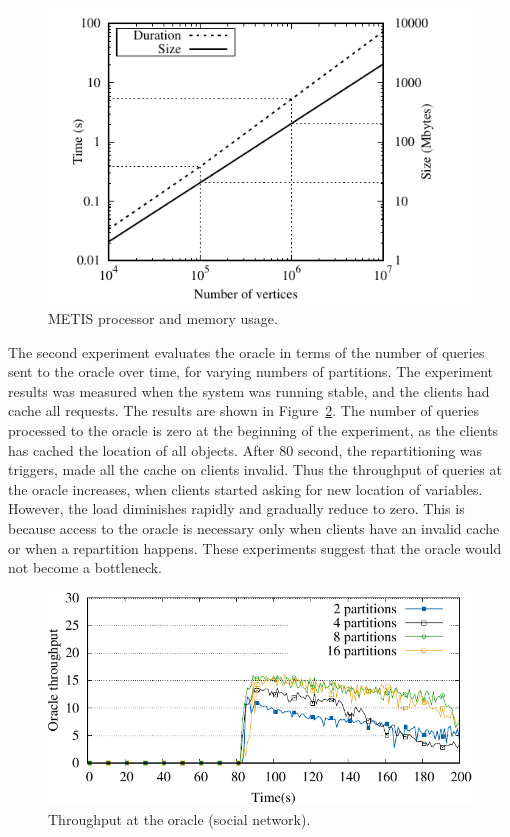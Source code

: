 \begin{figure}[ht!]
  \centering
    \includegraphics[width=\columnwidth]{figures/metis_size_time}
	\caption{METIS processor and memory usage.}
	\label{fig:metis_size_time}
\end{figure}

The second experiment evaluates the oracle in terms of the number of queries sent to the oracle over
time, for varying numbers of partitions. The experiment results was measured when the system was running stable, 
and the clients had cache all requests.  The results are shown in
Figure~\ref{fig:cpu_oracle}. The number of queries processed to the oracle is zero at the 
beginning of the experiment, as the clients has cached the location of all objects.
After 80 second, the repartitioning was triggers, made all the cache on clients invalid.
Thus the throughput of queries at the oracle increases, when clients started asking for new location of variables.
However, the load diminishes rapidly and gradually reduce to zero. This is because access to the oracle is necessary only
when clients have an invalid cache or when a repartition happens. These experiments
suggest that the oracle would not become a bottleneck.%

\begin{figure}[ht]
	\includegraphics[width=\columnwidth]{figures/eurosys/chirper-oracle-load.pdf}
  \caption{Throughput at the oracle (social network).}
	\label{fig:cpu_oracle}
\end{figure}

